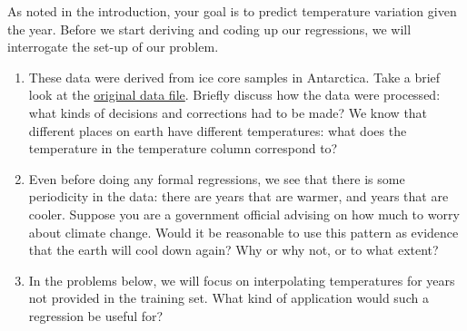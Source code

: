 \documentclass[submit]{harvardml}
\begin{document}
\begin{problem}
As noted in the introduction, your goal is to predict temperature
variation given the year.  Before we start deriving and coding up our
regressions, we will interrogate the set-up of our problem.  

\begin{enumerate}
  \item These data were derived from ice core samples in Antarctica.
    Take a brief look at the
    \href{https://www.ncei.noaa.gov/pub/data/paleo/icecore/antarctica/epica_domec/edc3deuttemp2007.txt}{original
      data file}.  Briefly discuss how the data were processed: what kinds of
    decisions and corrections had to be made?  We know that different
    places on earth have different temperatures: what does the
    temperature in the temperature column correspond to?
        
  \item Even before doing any formal regressions, we see that there is
    some periodicity in the data: there are years that are warmer, and
    years that are cooler.  Suppose you are a government official
    advising on how much to worry about climate change.  Would it be
    reasonable to use this pattern as evidence that the earth will
    cool down again?  Why or why not, or to what extent?


  \item In the problems below, we will focus on interpolating
    temperatures for years not provided in the training set.  What
    kind of application would such a regression be useful for?

\end{enumerate}
  
\end{problem}
\end{document}
